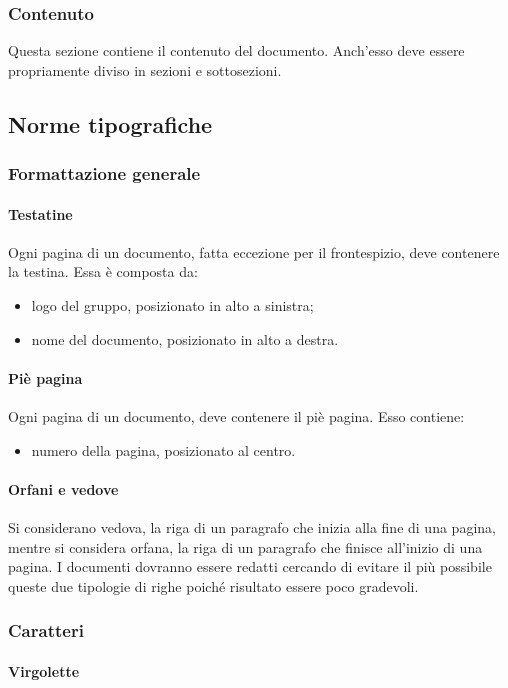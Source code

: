 \documentclass[../NormeProgetto.tex]{subfiles}
\begin{document}
		\subsubsection{Contenuto}
		Questa sezione contiene il contenuto del documento. Anch'esso deve essere propriamente diviso in sezioni e sottosezioni.
	
	\subsection{Norme tipografiche}
		\subsubsection{Formattazione generale}
			\paragraph{Testatine}
			Ogni pagina di un documento, fatta eccezione per il frontespizio, deve contenere la testina. Essa è composta da:
			\begin{itemize}
			\item logo del gruppo, posizionato in alto a sinistra;
			\item nome del documento, posizionato in alto a destra.
			\end{itemize}
			\paragraph{Piè pagina}
			Ogni pagina di un documento, deve contenere il piè pagina. Esso contiene:
			\begin{itemize}
			\item numero della pagina, posizionato al centro.
			\end{itemize}
			\paragraph{Orfani e vedove}
			Si considerano vedova, la riga di un paragrafo che inizia alla fine di una pagina, mentre si considera orfana, la riga di un paragrafo che finisce all'inizio di una pagina. I documenti dovranno essere redatti cercando di evitare il più possibile queste due tipologie di righe poiché risultato essere poco gradevoli. 
		\subsubsection{Caratteri}
			\paragraph{Virgolette}
\end{document}

